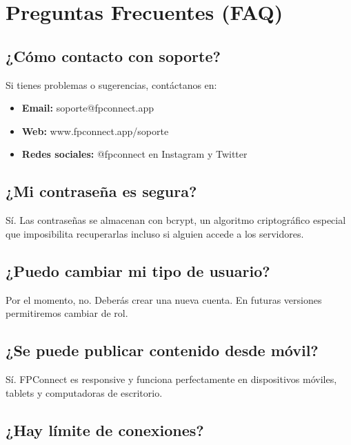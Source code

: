 \documentclass[a4paper]{report}
\begin{document}
\newpage

\chapter{Preguntas Frecuentes (FAQ)}

\section{¿Cómo contacto con soporte?}

Si tienes problemas o sugerencias, contáctanos en:
\begin{itemize}
  \item \textbf{Email:} soporte@fpconnect.app
  \item \textbf{Web:} www.fpconnect.app/soporte
  \item \textbf{Redes sociales:} @fpconnect en Instagram y Twitter
\end{itemize}

\section{¿Mi contraseña es segura?}

Sí. Las contraseñas se almacenan con bcrypt, un algoritmo criptográfico especial que imposibilita recuperarlas incluso si alguien accede a los servidores.

\section{¿Puedo cambiar mi tipo de usuario?}

Por el momento, no. Deberás crear una nueva cuenta. En futuras versiones permitiremos cambiar de rol.

\section{¿Se puede publicar contenido desde móvil?}

Sí. FPConnect es responsive y funciona perfectamente en dispositivos móviles, tablets y computadoras de escritorio.

\section{¿Hay límite de conexiones?}
\end{document}

